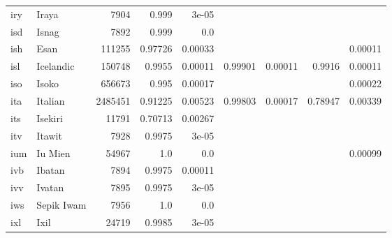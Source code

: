 \documentclass[11pt]{article}
\begin{document}
\begin{table*}[h]
{\begin{tabular}{llrrrrrrr}
iry         & Iraya         & 7904         & 0.999         & 3e-05         &          &          &          &          \\

isd         & Isnag         & 7892         & 0.999         & 0.0         &          &          &          &          \\

ish         & Esan         & 111255         & 0.97726         & 0.00033         &          &          &          & 0.00011         \\

isl         & Icelandic         & 150748         & 0.9955         & 0.00011         & 0.99901         & 0.00011         & 0.9916         & 0.00011         \\

iso         & Isoko         & 656673         & 0.995         & 0.00017         &          &          &          & 0.00022         \\

ita         & Italian         & 2485451         & 0.91225         & 0.00523         & 0.99803         & 0.00017         & 0.78947         & 0.00339         \\

its         & Isekiri         & 11791         & 0.70713         & 0.00267         &          &          &          &          \\

itv         & Itawit         & 7928         & 0.9975         & 3e-05         &          &          &          &          \\

ium         & Iu Mien         & 54967         & 1.0         & 0.0         &          &          &          & 0.00099         \\

ivb         & Ibatan         & 7894         & 0.9975         & 0.00011         &          &          &          &          \\

ivv         & Ivatan         & 7895         & 0.9975         & 3e-05         &          &          &          &          \\

iws         & Sepik Iwam         & 7956         & 1.0         & 0.0         &          &          &          &          \\

ixl         & Ixil         & 24719         & 0.9985         & 3e-05         &          &          &          &          \\


\end{tabular}}
\end{table*}
\end{document}
